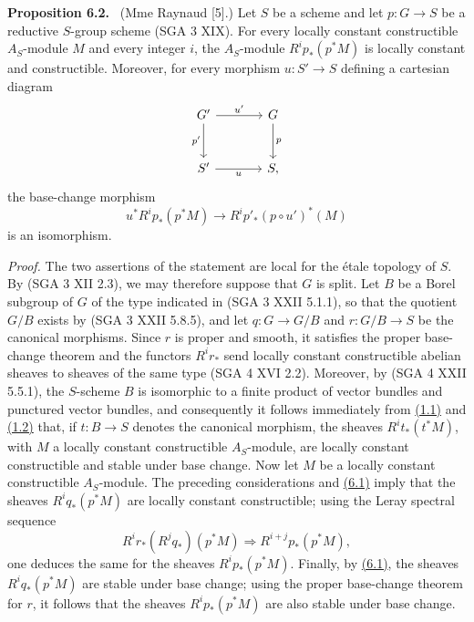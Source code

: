 \documentclass[11pt]{article}
\newenvironment{statement}[1]{\par\medskip\noindent\textbf{#1.}\ }{\par\medskip}
\begin{document}
\label{sga5:VII:proposition:6.2}\begin{statement}{Proposition 6.2}
(Mme Raynaud [5].) Let $S$ be a scheme and let $p:G\to S$ be a reductive $S$-group scheme (SGA 3 XIX). For every locally constant constructible $A_S$-module $M$ and every integer $i$, the $A_S$-module $R^ip_*(p^*M)$ is locally constant and constructible. Moreover, for every morphism $u:S'\to S$ defining a cartesian diagram
\[
\begin{tikzcd}[column sep=large,row sep=large]
G' \arrow[r,"u'"] \arrow[d,"p'"'] & G \arrow[d,"p"]\\
S' \arrow[r,"u"'] & S,
\end{tikzcd}
\]
the base-change morphism
\[
u^*R^ip_*(p^*M)\to R^ip'_*(p\circ u')^*(M)
\]
is an isomorphism.
\end{statement}

\emph{Proof.} The two assertions of the statement are local for the étale topology of $S$. By (SGA 3 XII 2.3), we may therefore suppose that $G$ is split. Let $B$ be a Borel subgroup of $G$ of the type indicated in (SGA 3 XXII 5.1.1), so that the quotient $G/B$ exists by (SGA 3 XXII 5.8.5), and let $q:G\to G/B$ and $r:G/B\to S$ be the canonical morphisms. Since $r$ is proper and smooth, it satisfies the proper base-change theorem and the functors $R^ir_*$ send locally constant constructible abelian sheaves to sheaves of the same type (SGA 4 XVI 2.2). Moreover, by (SGA 4 XXII 5.5.1), the $S$-scheme $B$ is isomorphic to a finite product of vector bundles and punctured vector bundles, and consequently it follows immediately from \hyperref[sga5:VII:proposition:1.1]{(1.1)} and \hyperref[sga5:VII:corollary:1.2]{(1.2)} that, if $t:B\to S$ denotes the canonical morphism, the sheaves $R^it_*(t^*M)$, with $M$ a locally constant constructible $A_S$-module, are locally constant constructible and stable under base change. Now let $M$ be a locally constant constructible $A_S$-module. The preceding considerations and \hyperref[sga5:VII:proposition:6.1]{(6.1)} imply that the sheaves $R^iq_*(p^*M)$ are locally constant constructible; using the Leray spectral sequence
\[
R^ir_*(R^jq_*)(p^*M)\Rightarrow R^{i+j}p_*(p^*M),
\]
one deduces the same for the sheaves $R^ip_*(p^*M)$. Finally, by \hyperref[sga5:VII:proposition:6.1]{(6.1)}, the sheaves $R^iq_*(p^*M)$ are stable under base change; using the proper base-change theorem for $r$, it follows that the sheaves $R^ip_*(p^*M)$ are also stable under base change.
\end{document}
